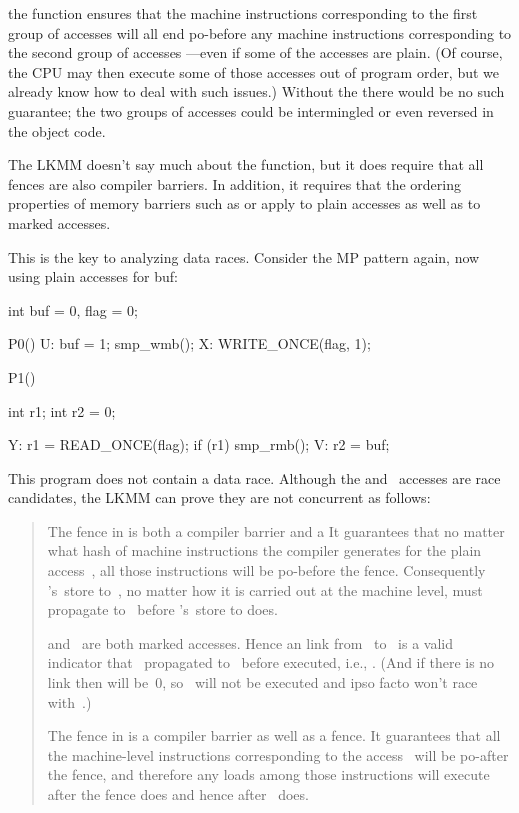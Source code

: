 the  function ensures that the machine instructions
corresponding to the first group of accesses will all end po-before
any machine instructions corresponding to the second group of accesses%
---even if some of the accesses are plain.
(Of course, the CPU may
then execute some of those accesses out of program order, but we
already know how to deal with such issues.)
Without the 
there would be no such guarantee; the two groups of accesses could be
intermingled or even reversed in the object code.

The LKMM doesn't say much about the  function, but it does
require that all fences are also compiler barriers.
In addition, it
requires that the ordering properties of memory barriers such as
 or  apply to plain accesses as well as to
marked accesses.

This is the key to analyzing data races.
Consider the MP pattern
again, now using plain accesses for buf:

\begin{VerbatimU}
	int buf = 0, flag = 0;

	P0()
	{
		U: buf = 1;
		   smp_wmb();
		X: WRITE_ONCE(flag, 1);
	}

	P1()
	{
		int r1;
		int r2 = 0;

		Y: r1 = READ_ONCE(flag);
		   if (r1) {
			   smp_rmb();
			V: r2 = buf;
		   }
	}
\end{VerbatimU}

This program does not contain a data race.
Although the  and~
accesses are race candidates, the LKMM can prove they are not
concurrent as follows:

\begin{quote}
	The  fence in  is both a compiler barrier and a
	It guarantees that no matter what hash of
	machine instructions the compiler generates for the plain
	access~, all those instructions will be po-before the fence.
	Consequently 's~store to~, no matter how it is carried out
	at the machine level, must propagate to~ before 's~store to
	 does.

	 and~ are both marked accesses.
	Hence an  link from~ to~%
	 is a valid indicator that ~propagated to~
	before 
	executed, i.e., .  (And if there is no  link then
	 will be~0, so ~will not be executed and ipso facto won't
	race with~.)

	The  fence in  is a compiler barrier as well as a
	fence.
	It guarantees that all the machine-level instructions
	corresponding to the access~ will be po-after the fence, and
	therefore any loads among those instructions will execute
	after the fence does and hence after ~does.
\end{quote}

